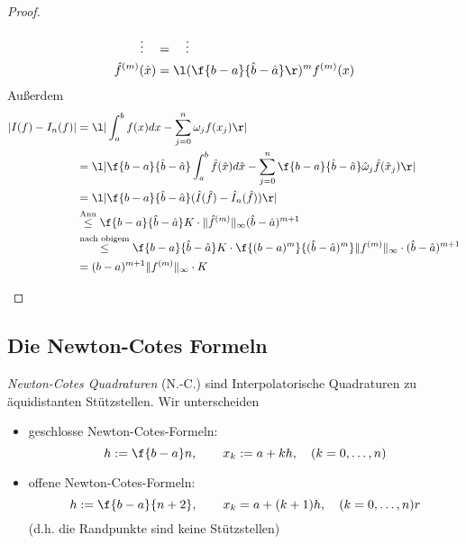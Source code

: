 \documentclass[11pt]{scrartcl}
\begin{document}
\begin{st}[Koordinatentransformation]
\begin{proof}
\begin{enumerate}[i)]
\begin{align*}
					\vdots \quad &= \quad \vdots \\
					\hat f^{(m)}(\hat x) &= \l( \f {b-a}{\hat b-\hat a} \r)^m f^{(m)}(x)
				\end{align*}
				Außerdem
				\begin{align*}
					|I(f) - I_n(f)| 
					&= \l| \int_a^b f(x) dx - \sum_{j=0}^n \omega_j f(x_j) \r| \\
					&= \l| \f {b-a}{\hat b- \hat a} \int_a^b \hat f(\hat x) d\hat x - \sum_{j=0}^n \f {b-a}{\hat b - \hat a} \hat \omega_j \hat f(\hat x_j) \r| \\
					&= \l| \f {b-a}{\hat b - \hat a} (\hat I(\hat f) - \hat I_n(\hat f)) \r| \\
					&\stackrel{\text{Ann}}\le \f {b-a}{\hat b - \hat a}K\cdot \|\hat f^{(m)}\|_\infty (\hat b - \hat a)^{m+1} \\
					&\stackrel{\text{nach obigem}}\le \f {b-a}{\hat b - \hat a} K \cdot \f {(b-a)^m}{(\hat b - \hat a)^m} \|f^{(m)}\|_\infty \cdot (\hat b - \hat a)^{m+1} \\
					&= (b-a)^{m+1}\|f^{(m)}\|_\infty \cdot K
				\end{align*}
		\end{enumerate}
	\end{proof}
\end{st}


\subsection{Die Newton-Cotes Formeln}


\begin{df}
	\label{2.9}
	\emph{Newton-Cotes Quadraturen} (N.-C.) sind Interpolatorische Quadraturen zu äquidistanten Stützstellen.
	Wir unterscheiden
	\begin{itemize}
		\item
			geschlosse Newton-Cotes-Formeln:
			\[
				h:= \f {b-a}n, \qquad x_k := a + kh, \quad (k=0,\dotsc,n)
			\]
		\item
			offene Newton-Cotes-Formeln:
			\[
				h:= \f {b-a}{n+2}, \qquad x_k = a+ (k+1)h, \quad (k=0,\dotsc,n)r
			\]
			(d.h. die Randpunkte sind keine Stützstellen)
	\end{itemize}
\end{df}
\end{document}
